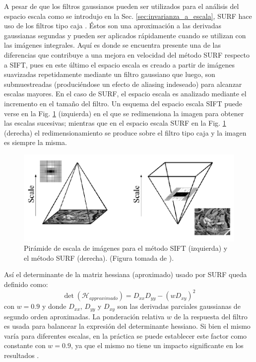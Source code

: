       A pesar de que los filtros gaussianos pueden ser utilizados para el análisis del espacio escala como se introdujo en la Sec. \ref{sec:invarianza_a_escala}, SURF hace uso de los filtros tipo caja \cite{conf/nips/SimardBHL98}. Éstos son una aproximación a las derivadas gaussianas segundas y pueden ser aplicados rápidamente cuando se utilizan con las imágenes integrales. Aquí es donde se encuentra presente una de las diferencias que contribuye a una mejora en velocidad del método SURF respecto a SIFT, pues en este último el espacio escala es creado a partir de imágenes suavizadas repetidamente mediante un filtro gaussiano que luego, son submuestreadas (produciéndose un efecto de aliasing indeseado) para alcanzar escalas mayores. En el caso de SURF, el espacio escala es analizado mediante el incremento en el tamaño del filtro. %
      Un esquema del espacio escala SIFT puede verse en la Fig. \ref{fig:pyramidfilters} (izquierda) en el que se redimensiona la imagen para obtener las escalas sucesivas; mientras que en el espacio escala SURF en la Fig. \ref{fig:pyramidfilters} (derecha) el redimensionamiento se produce sobre el filtro tipo caja y la imagen es siempre la misma.
      \begin{figure}[tbhp]
	\centering
	      \includegraphics[scale=0.6]{./figs/pyramidfilters}
	  \caption[Pirámide de escala de imágenes para SIFT y SURF]{Pirámide de escala de imágenes para el método SIFT (izquierda) y el método SURF (derecha). (Figura tomada de \cite{Bay:2008:SRF}).}
	\label{fig:pyramidfilters}          %
      \end{figure}

      Así el determinante de la matriz hessiana (aproximado) usado por SURF queda definido como:
\begin{equation}
      \label{eq:det_happrox}
      \det(\mathcal{H}_{approximado})=D_{xx}D_{yy}-(wD_{xy})^{2} 
      \end{equation}
con $w=0.9$ y donde $\mathit{D}_{xx}$, $\mathit{D}_{yy}$ y $\mathit{D}_{xy}$ son las derivadas parciales gaussianas de segundo orden aproximadas. La ponderación relativa $w$ de la respuesta del filtro es usada para balancear la expresión del determinante hessiano. Si bien el mismo varía para diferentes escalas, en la práctica se puede establecer este factor como constante con $w=0.9$, ya que el mismo no tiene un impacto significante en los resultados \cite{Bay:2008:SRF}.

